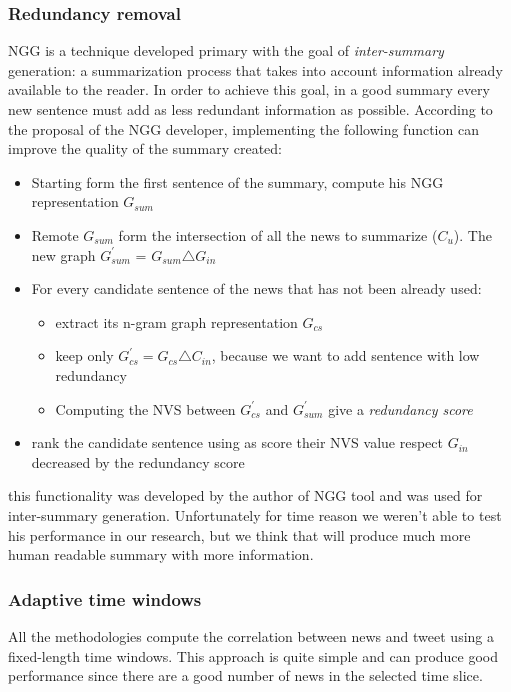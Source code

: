 \documentclass{acm_proc_article-sp-sigmod07}
\begin{document}
\subsubsection*{Redundancy removal}
NGG is a technique developed primary with the goal of \emph{inter-summary} generation: a summarization process that takes into account information already available to the reader. In order to achieve this goal, in a good summary every new sentence must add as less redundant information as possible.
According to the proposal of the NGG developer, implementing the following function can improve the quality of the summary created:
\begin{itemize}
	\item Starting form the first sentence of the summary, compute his NGG representation $G_{sum}$
	\item Remote $G_{sum}$ form the intersection of all the news to summarize ($C_{u}$). The new graph $G_{sum}^{\prime}$ = $G_{sum} \triangle G_{in}$
	\item For every candidate sentence of the news that has not been already used:
	\begin{itemize}
		\item extract its n-gram graph representation $G_{cs}$
		\item keep only $G_{cs}^{\prime} = G_{cs} \triangle C_{in}$, because we want to add sentence with low redundancy
		\item Computing the NVS between $G_{cs}^{\prime}$ and $G_{sum}^{\prime}$ give a \emph{redundancy score}
	\end{itemize}
	\item rank the candidate sentence using as score their NVS value respect $G_{in}$ decreased by the redundancy score
\end{itemize}
this functionality was developed by the author of NGG tool and was used for inter-summary generation. Unfortunately for time reason we weren't able to test his performance in our research, but we think that will produce much more human readable summary with more information.

\subsubsection*{Adaptive time windows}
All the methodologies compute the correlation between news and tweet using a fixed-length time windows. This approach is quite simple and can produce good performance since there are a good number of news in the selected time slice. 
\end{document}
